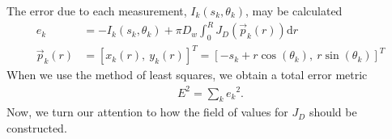 The error due to each measurement, $I_k(s_k, \theta_k)$, may be calculated
\begin{align}
e_k &= - I_k\left(s_k, \theta_k\right) + \pi D_w \int_0^R J_D\left(\vec{p}_k(r)\right) \mathrm{d} r\label{eqn:ek}\\
\vec{p}_k(r) &= [x_k(r),\ y_k(r)]^T = [-s_k + r\cos(\theta_k),\ r\sin(\theta_k)]^T \nonumber
\end{align}
When we use the method of least squares, we obtain a total error metric
\begin{align}
E^2 = \sum_k e_k{^2}.
\end{align}
Now, we turn our attention to how the field of values for $J_D$ should be constructed.
